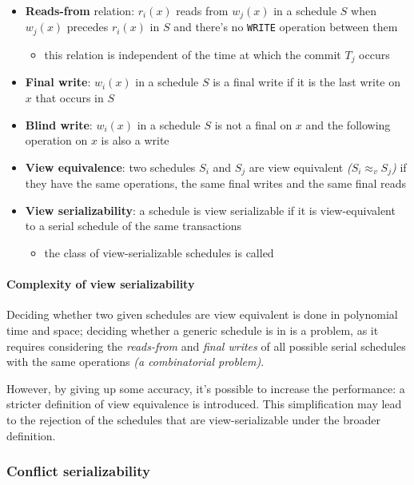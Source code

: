 \documentclass[english]{article}
\begin{document}
\begin{itemize}
  \item \textbf{Reads-from} relation: \(r_i(x)\) reads from \(w_j(x)\) in a schedule \(S\) when \(w_j(x)\) precedes \(r_i(x)\) in \(S\) and there's no \texttt{WRITE} operation between them
        \begin{itemize}
          \item this relation is independent of the time at which the commit \(T_j\) occurs
        \end{itemize}
  \item \textbf{Final write}: \(w_i(x)\) in a schedule \(S\) is a final write if it is the last write on \(x\) that occurs in \(S\)
  \item \textbf{Blind write}: \(w_i(x)\) in a schedule \(S\) is not a final on \(x\) and the following operation on \(x\) is also a write
  \item \textbf{View equivalence}: two schedules \(S_i\) and \(S_j\) are view equivalent \textit{(\(S_i \approx_v S_j\))} if they have the same operations, the same final writes and the same final reads
  \item \textbf{View serializability}: a schedule is view serializable if it is view-equivalent to a serial schedule of the same transactions
        \begin{itemize}
          \item the class of view-serializable schedules is called \VSR
        \end{itemize}
\end{itemize}

\paragraph{Complexity of view serializability}

Deciding whether two given schedules are view equivalent is done in polynomial time and space;
deciding whether a generic schedule is in \VSR is a \NPC problem, as it requires considering the \textit{reads-from} and \textit{final writes} of all possible serial schedules with the same operations \textit{(a combinatorial problem)}.

However, by giving up some accuracy, it's possible to increase the performance: a stricter definition of view equivalence is introduced.
This simplification may lead to the rejection of the schedules that are view-serializable under the broader definition.

\subsubsection{Conflict serializability}
\end{document}
